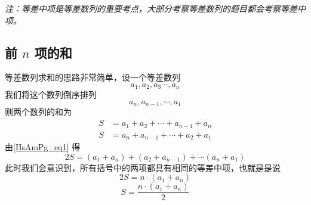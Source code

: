 \textsl{注：等差中项是等差数列的重要考点，大部分考察等差数列的题目都会考察等差中项。}

\subsection{前 $n$ 项的和}
等差数列求和的思路非常简单，设一个等差数列
\begin{equation}
a_1,a_2,a_3\cdots,a_n
\end{equation}
我们将这个数列倒序排列
\begin{equation}
a_n,a_{n-1},\cdots,a_1
\end{equation}
则两个数列的和为
\begin{equation}\label{HsAmPg_eq1}
\begin{aligned}
S &= a_1 + a_2 + \cdots + a_{n-1} + a_n \\
S &= a_n + a_{n - 1} + \cdots + a_2 + a_1
\end{aligned}
\end{equation}
由\autoref{HsAmPg_eq1} 得
\begin{equation}
2S = (a_1+a_n) + (a_2+a_{n-1}) +\cdots (a_n + a_1)
\end{equation}
此时我们会意识到，所有括号中的两项都具有相同的等差中项，也就是是说
\begin{equation}
2S = n \cdot (a_1+a_n)
\end{equation}
\begin{equation}
S = \frac{n\cdot(a_1+a_n)}{2}
\end{equation}